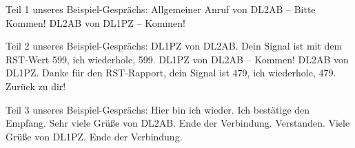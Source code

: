 \begin{frame}Teil 1 unseres Beispiel-Gesprächs:
    \pause{}\pause{}
    \pause
    Allgemeiner Anruf von DL2AB -- Bitte Kommen!
    \pause
    DL2AB von DL1PZ -- Kommen!



\end{frame}

\begin{frame}Teil 2 unseres Beispiel-Gesprächs:
    \pause{}\pause{}
    \pause
    DL1PZ von DL2AB. Dein Signal ist mit dem RST-Wert 599, ich wiederhole, 599. DL1PZ von DL2AB -- Kommen!
    \pause
    DL2AB von DL1PZ. Danke für den RST-Rapport, dein Signal ist 479, ich wiederhole, 479. Zurück zu dir!



\end{frame}

\begin{frame}Teil 3 unseres Beispiel-Gesprächs:
    \pause{}\pause{}
    \pause
    Hier bin ich wieder. Ich bestätige den Empfang. Sehr viele Grüße von DL2AB. Ende der Verbindung.
    \pause
    Verstanden. Viele Grüße von DL1PZ. Ende der Verbindung.



\end{frame}

